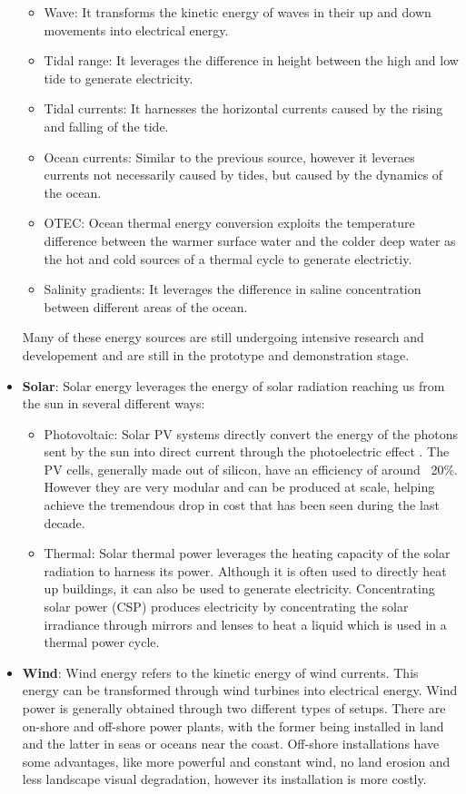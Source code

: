 \begin{itemize}
    \begin{itemize}
        \item Wave: It transforms the kinetic energy of waves in their up and down movements into electrical energy.
        \item Tidal range: It leverages the difference in height between the high and low tide to generate electricity. 
        \item Tidal currents: It harnesses the horizontal currents caused by the rising and falling of the tide.
        \item Ocean currents: Similar to the previous source, however it leveraes currents not necessarily caused by tides, but caused by the dynamics of the ocean.
        \item OTEC: Ocean thermal energy conversion exploits the temperature difference between the warmer surface water and the colder deep water as the hot and cold sources of a thermal cycle to generate electrictiy.
        \item Salinity gradients: It leverages the difference in saline concentration between different areas of the ocean.
    \end{itemize}
    Many of these energy sources are still undergoing intensive research and developement and are still in the prototype and demonstration stage.
    \item \textbf{Solar}: Solar energy leverages the energy of solar radiation reaching us from the sun in several different ways:
    \begin{itemize}
        \item Photovoltaic: Solar PV systems directly convert the energy of the photons sent by the sun into direct current through the photoelectric effect \cite{einstein_1905}. The PV cells, generally made out of silicon, have an efficiency of around ~20\%. However they are very modular and can be produced at scale, helping achieve the tremendous drop in cost that has been seen during the last decade. 
        \item Thermal: Solar thermal power leverages the heating capacity of the solar radiation to harness its power. Although it is often used to directly heat up buildings, it can also be used to generate electricity. Concentrating solar power (CSP) produces electricity by concentrating the solar irradiance through mirrors and lenses to heat a liquid which is used in a thermal power cycle. 
    \end{itemize}
    \item \textbf{Wind}: Wind energy refers to the kinetic energy of wind currents. This energy can be transformed through wind turbines into electrical energy. Wind power is generally obtained through two different types of setups. There are on-shore and off-shore power plants, with the former being installed in land and the latter in seas or oceans near the coast. Off-shore installations have some advantages, like more powerful and constant wind, no land erosion and less landscape visual degradation, however its installation is more costly. 
\end{itemize}

